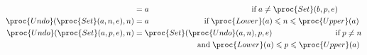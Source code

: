 \begin{itemize}
\begin{align*}
    &= a
    \qquad\qquad\qquad\qquad\qquad\qquad\quad \text{if} \; a
    \neq \proc{Set} (b, p, e)\\ 
       \proc{Undo} (\proc{Set} (a, n, e), n)
    &= a
      \qquad\qquad\qquad\quad \text{if} \; \proc{Lower} (a) \leqslant n
      \leqslant \proc{Upper} (a)\\
       \proc{Undo} (\proc{Set} (a, p, e), n)
    &= \proc{Set} (\proc{Undo} (a, n), p, e)
    \qquad \qquad \qquad \qquad \text{if} \; p \neq n\\
    & \qquad \qquad \qquad \qquad \text{and} \; \proc{Lower} (a)
      \leqslant p \leqslant \proc{Upper} (a)
    \end{align*}

\end{itemize}
